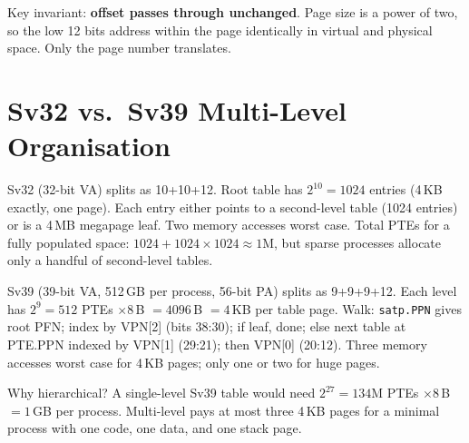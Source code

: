\begin{center}
\end{center}
Key invariant: \textbf{offset passes through unchanged}. Page size is a power of two, so the low 12 bits address within the page identically in virtual and physical space. Only the page number translates.

\section{Sv32 vs.\ Sv39 Multi-Level Organisation}
Sv32 (32-bit VA) splits as 10+10+12. Root table has $2^{10}=1024$ entries (4\,KB exactly, one page). Each entry either points to a second-level table (1024 entries) or is a 4\,MB megapage leaf. Two memory accesses worst case. Total PTEs for a fully populated space: $1024 + 1024\times1024 \approx 1$M, but sparse processes allocate only a handful of second-level tables.

Sv39 (39-bit VA, 512\,GB per process, 56-bit PA) splits as 9+9+9+12. Each level has $2^9=512$ PTEs $\times 8$\,B $=4096$\,B $=4$\,KB per table page. Walk: \texttt{satp.PPN} gives root PFN; index by VPN[2] (bits 38:30); if leaf, done; else next table at PTE.PPN indexed by VPN[1] (29:21); then VPN[0] (20:12). Three memory accesses worst case for 4\,KB pages; only one or two for huge pages.

Why hierarchical? A single-level Sv39 table would need $2^{27}=134$M PTEs $\times 8$\,B $=1$\,GB per process. Multi-level pays at most three 4\,KB pages for a minimal process with one code, one data, and one stack page.

